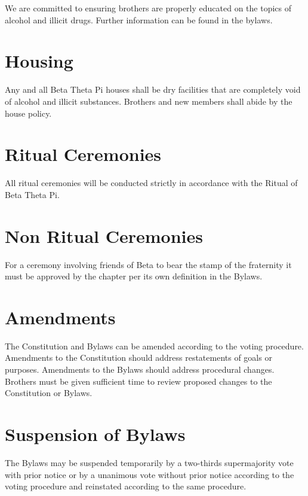 We are committed to ensuring brothers are properly educated on the topics of alcohol and illicit drugs.
Further information can be found in the bylaws.

\section{Housing}

Any and all Beta Theta Pi houses shall be dry facilities that are completely void of alcohol and illicit substances.
Brothers and new members shall abide by the house policy.


\section{Ritual Ceremonies}

All ritual ceremonies will be conducted strictly in accordance with the Ritual of Beta Theta Pi.

\section{Non Ritual Ceremonies}

For a ceremony involving friends of Beta to bear the stamp of the fraternity it must be approved by the chapter per its own definition in the Bylaws.


\section{Amendments}

The Constitution and Bylaws can be amended according to the voting procedure.
Amendments to the Constitution should address restatements of goals or purposes.
Amendments to the Bylaws should address procedural changes.
Brothers must be given sufficient time to review proposed changes to the Constitution or Bylaws.

\section{Suspension of Bylaws}

The Bylaws may be suspended temporarily by a two-thirds supermajority vote with prior notice or by a unanimous vote without prior notice according to the voting procedure and reinstated according to the same procedure.

